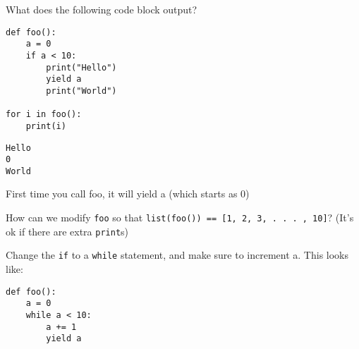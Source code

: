 \question What does the following code block output?
\begin{lstlisting}
def foo():
    a = 0
    if a < 10:
        print("Hello")
        yield a
        print("World")

for i in foo():
    print(i)
\end{lstlisting}

\begin{solution}[0.75in]
\begin{lstlisting}
Hello
0
World
\end{lstlisting}
First time you call foo, it will yield a (which starts as 0)
\end{solution}

\question How can we modify \texttt{foo} so that
\texttt{list(foo()) == [1, 2, 3, . . . , 10]}?
(It's ok if there are extra \texttt{print}s)

\begin{solution}[0.50in]
Change the \texttt{if} to a \texttt{while} statement, and make sure to increment
a. This looks like:

\begin{lstlisting}
def foo():
    a = 0
    while a < 10:
        a += 1
        yield a
\end{lstlisting}
\end{solution}
